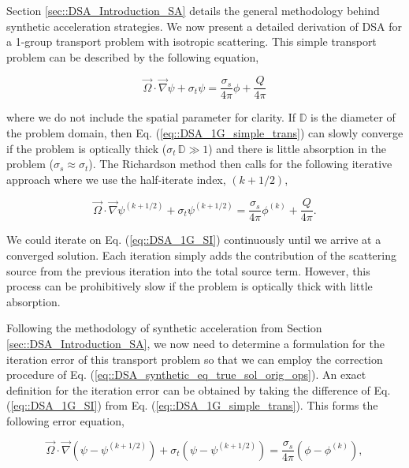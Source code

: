 Section \ref{sec::DSA_Introduction_SA} details the general methodology behind synthetic acceleration strategies. We now present a detailed derivation of DSA for a 1-group transport problem with isotropic scattering. This simple transport problem can be described by the following equation,

\begin{equation}
\label{eq::DSA_1G_simple_trans}
\vec{\Omega} \cdot \vec{\nabla} \psi + \sigma_t \psi =  \frac{ \sigma_s}{4 \pi} \phi + \frac{Q}{4 \pi}
\end{equation}

\noindent where we do not include the spatial parameter for clarity. If $\mathbb{D}$ is the diameter of the problem domain, then Eq. (\ref{eq::DSA_1G_simple_trans}) can slowly converge if the problem is optically thick ($ \sigma_t \, \mathbb{D} \gg 1$) and there is little absorption in the problem ($\sigma_s \approx \sigma_t$). The Richardson method then calls for the following iterative approach where we use the half-iterate index, ${(k+1/2)}$,

\begin{equation}
\label{eq::DSA_1G_SI}
\vec{\Omega} \cdot \vec{\nabla} \psi^{(k+1/2)} + \sigma_t \psi^{(k+1/2)} =   \frac{ \sigma_s}{4 \pi} \phi^{(k)} + \frac{Q}{4 \pi}. 
\end{equation}

\noindent We could iterate on Eq. (\ref{eq::DSA_1G_SI}) continuously until we arrive at a converged solution. Each iteration simply adds the contribution of the scattering source from the previous iteration into the total source term. However, this process can be prohibitively slow if the problem is optically thick with little absorption. 

Following the methodology of synthetic acceleration from Section \ref{sec::DSA_Introduction_SA}, we now need to determine a formulation for the iteration error of this transport problem so that we can employ the correction procedure of Eq. (\ref{eq::DSA_synthetic_eq_true_sol_orig_ops}). An exact definition for the iteration error can be obtained by taking the difference of Eq. (\ref{eq::DSA_1G_SI}) from Eq. (\ref{eq::DSA_1G_simple_trans}). This forms the following error equation,

\begin{equation}
\label{eq::DSA_1G_SI_err}
\vec{\Omega} \cdot \vec{\nabla} \left( \psi - \psi^{(k+1/2)} \right) + \sigma_t \left( \psi -  \psi^{(k+1/2)}\right) =   \frac{ \sigma_s}{4 \pi} \left( \phi -  \phi^{(k)}\right)  ,
\end{equation}

